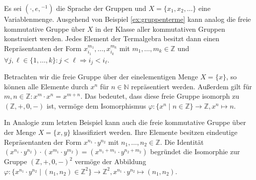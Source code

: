 \begin{example}
    Es sei $(\cdot,e,{}^{-1})$ die Sprache der Gruppen und $X=\{x_1,x_2,\ldots\}$ eine Variablenmenge.
    Ausgehend von Beispiel \ref{ex:gruppenterme} kann analog die freie kommutative Gruppe über $X$ in der Klasse
    aller kommutativen Gruppen konstruiert werden. Jedes Element der Term\-algebra besitzt dann einen Repräsentanten
    der Form $x_{i_1}^{m_1},\ldots,x_{i_{k}}^{m_k}$ mit $m_1,\ldots,m_k\in \mathbb{Z}$ und $\forall j,\ell\in\{1,\ldots,k\}:j<\ell\Rightarrow i_j<i_\ell$.
\end{example}

\begin{example}
    Betrachten wir die freie Gruppe über der einelementigen Menge $X=\{x\}$, so können alle Elemente durch $x^n$ für
    $n\in\mathbb{N}$ repräsentiert werden. Außerdem gilt für $m,n\in\mathbb{Z}:x^m\cdot x^n=x^{m+n}$. Das bedeutet,
    dass diese freie Gruppe isomorph zu $(\mathbb{Z},+,0,-)$ ist, vermöge dem Isomorphismus $\varphi:\{x^n\mid n\in\mathbb{Z}\}\to \mathbb{Z},x^n\mapsto n$.
\end{example}

\begin{example}
    In Analogie zum letzten Beispiel kann auch die freie kommutative Gruppe über der Menge $X=\{x,y\}$ klassifiziert werden.
    Ihre Elemente besitzen eindeutige Repräsentanten der Form $x^{n_1}\cdot y^{n_2}$ mit $n_1,\ldots,n_2\in\mathbb{Z}$.
    Die Identität $(x^{n_1}\cdot y^{n_2})\cdot (x^{m_1}\cdot y^{m_2})=(x^{n_1+m_1}\cdot y^{n_2+m_2})$ begründet die Isomorphie
    zur Gruppe $(\mathbb{Z},+,0,-)^2$ vermöge der Abbildung $\varphi:\{x^{n_1}\cdot y^{n_2}\mid (n_1,n_2)\in\mathbb{Z}^2\}\to \mathbb{Z}^2,x^{n_1}\cdot y^{n_2}\mapsto (n_1,n_2)$.
\end{example}

